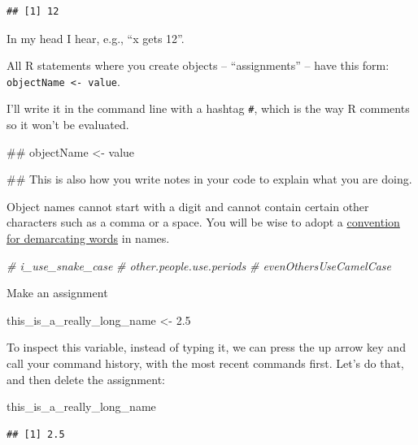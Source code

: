 \documentclass[]{book}
\newenvironment{Shaded}{\begin{snugshade}}{\end{snugshade}}
\newcommand{\FloatTok}[1]{\textcolor[rgb]{0.00,0.00,0.81}{{#1}}}
\newcommand{\StringTok}[1]{\textcolor[rgb]{0.31,0.60,0.02}{{#1}}}
\newcommand{\CommentTok}[1]{\textcolor[rgb]{0.56,0.35,0.01}{\textit{{#1}}}}
\newcommand{\NormalTok}[1]{{#1}}
\theoremstyle{definition}
\theoremstyle{definition}
\theoremstyle{definition}
\theoremstyle{remark}
\begin{document}
\begin{verbatim}
## [1] 12
\end{verbatim}

In my head I hear, e.g., ``x gets 12''.

All R statements where you create objects -- ``assignments'' -- have
this form: \texttt{objectName\ \textless{}-\ value}.

I'll write it in the command line with a hashtag \texttt{\#}, which is
the way R comments so it won't be evaluated.

\begin{Shaded}
\begin{Highlighting}[]
\NormalTok{## objectName <- value}

\NormalTok{## This is also how you write notes in your code to explain what you are doing.}
\end{Highlighting}
\end{Shaded}

Object names cannot start with a digit and cannot contain certain other
characters such as a comma or a space. You will be wise to adopt a
\href{http://en.wikipedia.org/wiki/Snake_case}{convention for
demarcating words} in names.

\begin{Shaded}
\begin{Highlighting}[]
\CommentTok{# i_use_snake_case}
\CommentTok{# other.people.use.periods}
\CommentTok{# evenOthersUseCamelCase}
\end{Highlighting}
\end{Shaded}

Make an assignment

\begin{Shaded}
\begin{Highlighting}[]
\NormalTok{this_is_a_really_long_name <-}\StringTok{ }\FloatTok{2.5}
\end{Highlighting}
\end{Shaded}

To inspect this variable, instead of typing it, we can press the up
arrow key and call your command history, with the most recent commands
first. Let's do that, and then delete the assignment:

\begin{Shaded}
\begin{Highlighting}[]
\NormalTok{this_is_a_really_long_name}
\end{Highlighting}
\end{Shaded}

\begin{verbatim}
## [1] 2.5
\end{verbatim}
\end{document}
